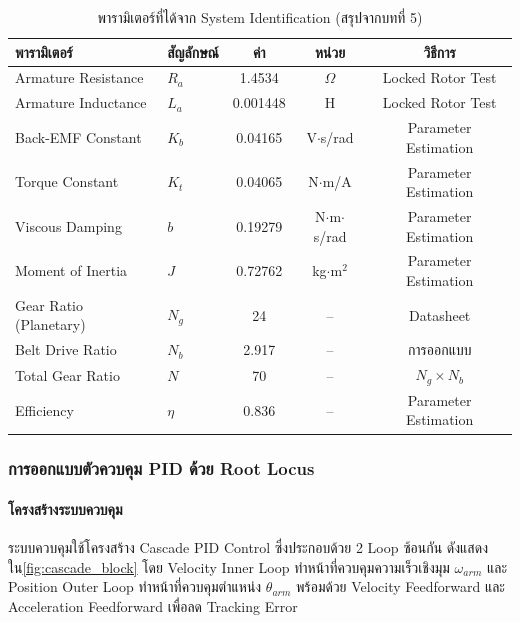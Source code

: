 \begin{table}[H]
  \centering
  \caption{พารามิเตอร์ที่ได้จาก System Identification (สรุปจากบทที่ 5)}
  \label{tab:sysid_params}
  \begin{tabular}{llccc}
    \toprule
    พารามิเตอร์ & สัญลักษณ์ & ค่า & หน่วย & วิธีการ \\
    \midrule
    Armature Resistance    & $R_a$  & 1.4534   & $\Omega$              & Locked Rotor Test \\
    Armature Inductance    & $L_a$  & 0.001448 & H                     & Locked Rotor Test \\
    Back-EMF Constant      & $K_b$  & 0.04165  & V$\cdot$s/rad         & Parameter Estimation \\
    Torque Constant        & $K_t$  & 0.04065  & N$\cdot$m/A           & Parameter Estimation \\
    Viscous Damping        & $b$    & 0.19279  & N$\cdot$m$\cdot$s/rad & Parameter Estimation \\
    Moment of Inertia      & $J$    & 0.72762  & kg$\cdot$m$^2$        & Parameter Estimation \\
    Gear Ratio (Planetary) & $N_g$  & 24       & --                    & Datasheet \\
    Belt Drive Ratio       & $N_b$  & 2.917    & --                    & การออกแบบ \\
    Total Gear Ratio       & $N$    & 70       & --                    & $N_g \times N_b$ \\
    Efficiency             & $\eta$ & 0.836    & --                    & Parameter Estimation \\
    \bottomrule
  \end{tabular}
\end{table}

\subsubsection{การออกแบบตัวควบคุม PID ด้วย Root Locus}
\label{subsubsec:pid_design}

\paragraph{โครงสร้างระบบควบคุม}

ระบบควบคุมใช้โครงสร้าง Cascade PID Control
ซึ่งประกอบด้วย 2 Loop ซ้อนกัน ดังแสดงใน\cref{fig:cascade_block}
โดย Velocity Inner Loop ทำหน้าที่ควบคุมความเร็วเชิงมุม $\omega_{arm}$
และ Position Outer Loop ทำหน้าที่ควบคุมตำแหน่ง $\theta_{arm}$
พร้อมด้วย Velocity Feedforward และ Acceleration Feedforward
เพื่อลด Tracking Error

